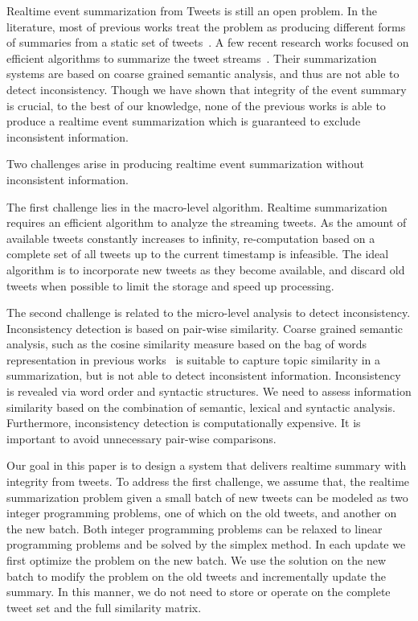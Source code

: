\documentclass[envcountsame]{llncs}
\begin{document}
Realtime event summarization from Tweets is still an open problem. In the literature, most of previous works treat the problem as producing different forms of summaries from a static set of tweets~\cite{Takamura2011Summarizing,Lin2012Generating,Rudra2015Extracting,Liu2016LEDS,Gillani2017Post}. A few recent research works focused on efficient algorithms to summarize the tweet streams~\cite{Shou2013Sumblr,Zubiaga2012Towards}. Their summarization systems are based on coarse grained semantic analysis, and thus are not able to detect inconsistency. Though we have shown that integrity of the event summary is crucial, to the best of our knowledge, none of the previous works is able to produce a realtime event summarization which is guaranteed to exclude inconsistent information.

Two challenges arise in producing realtime event summarization without inconsistent information.

The first challenge lies in the macro-level algorithm. Realtime summarization requires an efficient algorithm to analyze the streaming tweets. As the amount of available tweets constantly increases to infinity, re-computation based on a complete set of all tweets up to the current timestamp is infeasible. The ideal algorithm is to  incorporate new tweets as they become available, and discard old tweets when possible to limit the storage and speed up processing.

The second challenge is related to the micro-level analysis to detect inconsistency. Inconsistency detection is based on pair-wise similarity. Coarse grained semantic analysis, such as the cosine similarity measure based on the bag of words representation in previous works~\cite{Takamura2011Summarizing,Lin2012Generating,Rudra2015Extracting,Shou2013Sumblr,Liu2016LEDS,Gillani2017Post,Zubiaga2012Towards,Sharifi2010Summarizing} is suitable to capture topic similarity in a summarization, but is not able to detect inconsistent information. Inconsistency is revealed via word order and syntactic structures. We need to assess information similarity based on the combination of semantic, lexical and syntactic analysis. Furthermore, inconsistency detection is computationally expensive. It is important to avoid unnecessary pair-wise comparisons.

Our goal in this paper is to design a system that delivers realtime summary with integrity from tweets. To address the first challenge, we assume that, the realtime summarization problem given a small batch of new tweets can be modeled as two integer programming problems, one of which on the old tweets, and another on the new batch. Both integer programming problems can be relaxed to linear programming problems and be solved by the simplex method. In each update we first optimize the problem on the new batch. We use the solution on the new batch to modify the problem on the old tweets and incrementally update the summary.  In this manner, we do not need to store or operate on the complete tweet set and the full similarity matrix.
\end{document}
